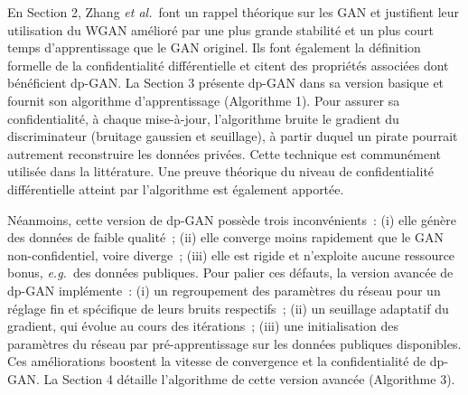 \documentclass[a4paper,11pt,twoside]{article}
\theoremstyle{definition}
\newcommand{\eg}{\textit{e.g.}}
\newcommand{\etal}{\textit{et al.}}
\begin{document}
En Section 2, Zhang \etal\ font un rappel théorique sur les GAN et justifient leur utilisation du WGAN amélioré par une plus grande stabilité et un plus court temps d'apprentissage que le GAN originel. Ils font également la définition formelle de la confidentialité différentielle et citent des propriétés associées dont bénéficient dp-GAN. La Section 3 présente dp-GAN dans sa version basique et fournit son algorithme d'apprentissage (Algorithme 1). Pour assurer sa confidentialité, à chaque mise-à-jour, l'algorithme bruite le gradient du discriminateur (bruitage gaussien et seuillage), à partir duquel un pirate pourrait autrement reconstruire les données privées. Cette technique est communément utilisée dans la littérature. Une preuve théorique du niveau de confidentialité différentielle atteint par l'algorithme est également apportée.

Néanmoins, cette version de dp-GAN possède trois inconvénients : (i) elle génère des données de faible qualité ; (ii) elle converge moins rapidement que le GAN non-confidentiel, voire diverge ; (iii) elle est rigide et n'exploite aucune ressource bonus, \eg\ des données publiques. Pour palier ces défauts, la version avancée de dp-GAN implémente : (i) un regroupement des paramètres du réseau pour un réglage fin et spécifique de leurs bruits respectifs ; (ii) un seuillage adaptatif du gradient, qui évolue au cours des itérations ; (iii) une initialisation des paramètres du réseau par pré-apprentissage sur les données publiques disponibles. Ces améliorations boostent la vitesse de convergence et la confidentialité de dp-GAN. La Section 4 détaille l'algorithme de  cette version avancée (Algorithme 3).
\end{document}
